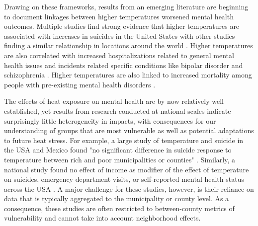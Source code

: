 \documentclass[fleqn,10pt]{wlscirep}
\begin{document}
Drawing on these frameworks, results from an emerging literature are beginning to document linkages between higher temperatures worsened mental health outcomes. Multiple studies find strong evidence that higher temperatures are associated with increases in suicides in the United States \cite{Burke2018Aug, Mullins2019Dec, Dixon2007May} with other studies finding a similar relationship in locations around the world \cite{Qi2014Dec, Page2007Aug, Likhvar2011Jan}. Higher temperatures are also correlated with increased hospitalizations related to general mental health issues \cite{Obradovich2018Oct, Mullins2019Dec} and incidents related specific conditions like bipolar disorder and schizophrenia \cite{Lee2007Jan, Sung2013Feb}. Higher temperatures are also linked to increased mortality among people with pre-existing mental health disorders \cite{Hansen2008Oct}.

The effects of heat exposure on mental health are by now relatively well established, yet results from research conducted at national scales indicate surprisingly little heterogeneity in impacts, with consequences for our understanding of groups that are most vulnerable as well as potential adaptations to future heat stress. For example, a large study of temperature and suicide in the USA and Mexico found "no significant difference in suicide response to temperature between rich and poor municipalities or counties" \cite{Burke2018Aug}. Similarly, a national study found no effect of income as modifier of the effect of temperature on suicides, emergency department visits, or self-reported mental health status across the USA \cite{Mullins2019Dec}. A major challenge for these studies, however, is their reliance on data that is typically aggregated to the municipality or county level. As a consequence, these studies are often restricted to between-county metrics of vulnerability and cannot take into account neighborhood effects.
\end{document}
